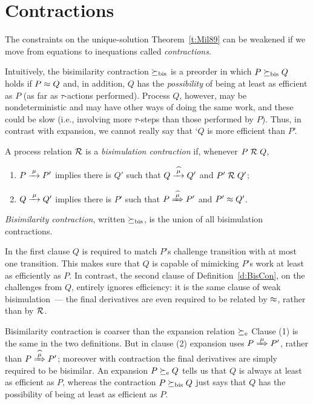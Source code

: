 \section{Contractions}
\label{s:mcontr}

The constraints on the unique-solution Theorem~\ref{t:Mil89} can be 
weakened if  we move from equations to inequations called
  \emph{contractions}.


  Intuitively,
  the bisimilarity contraction 
$\mathrel{\succeq_{\rm{bis}}}$ 
 is  a preorder in which 
$P \mathrel{\succeq_{\rm{bis}}} Q  $  holds  if $P \approx Q$ and, in addition, 
$Q$ has the \emph{possibility} of being at least as efficient as $P$ (as far as
$\tau$-actions performed). 
Process $Q$, however, may be nondeterministic and may have other ways
of doing the same work, and these could be  slow (i.e., involving
more $\tau$-steps than those performed by $P$).
Thus, in contrast with expansion,  we cannot really say that `$Q$ is more efficient than
$P$'.


\begin{definition}
\label{d:BisCon}
A process relation ${{\cal R}}$ 
 is a {\em  bisimulation  contraction}  if, whenever
 $P\mathrel{\cal R} Q$, %


\begin{enumerate}

\item   $P \arr\mu P'$ implies there is $Q'$ such that $Q \arcap \mu
  Q'$
 and $P' \mathrel{\cal R} Q'$;

\item 
    $Q \arr\mu Q'$   implies there is $P'$ such that $P \Arcap \mu
 P'$ and $P' 
\approx Q'$.
\end{enumerate}
\emph{Bisimilarity  contraction}, written $\mathrel{\succeq_{\rm{bis}}}$, is the union
of all bisimulation contractions. 
\end{definition}

In the first clause $Q$ is required to match $P$'s challenge
transition with at most one transition.
This makes sure that $Q$ is capable of mimicking $P$'s
work at least as efficiently as $P$. 
In contrast, the second clause of Definition~\ref{d:BisCon}, on the
challenges from $Q$, entirely ignores efficiency: it is the same
clause of  weak bisimulation~--- the final derivatives are even required
to be related  by $\approx$, rather than by ${\cal R}$.
 

Bisimilarity  contraction is coarser than 
 the expansion  relation 
$\mathrel{\succeq_{\rm{e}}}$ \cite{sangiorgi2017equations, arun1992efficiency}
Clause (1) is the same in the two
definitions. But in clause (2) expansion uses 
$P \Arr \mu P'$, rather than $P \Arcap \mu P'$; 
 moreover with
contraction the final derivatives are simply required to be bisimilar.
An expansion 
$P \mathrel{\succeq_{\rm{e}}} Q$
tells us  that $Q$ is always at least as efficient as $P$, whereas  the
 contraction $P \mathrel{\succeq_{\rm{bis}}} Q$  just says that $Q$ has the  possibility of
being at least as efficient as $P$. 

